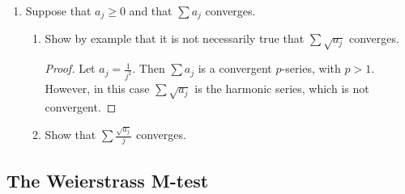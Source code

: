 \documentclass{article}
\begin{document}
\begin{enumerate}
\begin{proof}
                  $\sum_{j=J}^\infty \lvert a_j\rvert < \varepsilon$. Without loss of generality,
                  we can assume that $\varepsilon<1$. Then for all $j>J$, $a_j<1$. This
                  tells us that for all $j>J$, $a_j^2<a_j$ and thus
                  $\sum_{j=J}^\infty a_j^2 < \sum_{j=J}^\infty \lvert a_j\rvert < \varepsilon$.
                  Therefore, $\sum a_j^2$ converges.
            \end{proof}
      \item Suppose that $a_j\geq 0$ and that $\sum a_j$ converges.
            \begin{enumerate}
                  \item Show by example that it is not necessarily true that
                        $\sum\sqrt{a_j}$ converges.
                        \begin{proof}
                              Let $a_j=\frac{1}{j^2}$. Then $\sum a_j$ is a convergent
                              $p$-series, with $p>1$. However, in this case
                              $\sum\sqrt{a_j}$ is the harmonic series, which is not
                              convergent.
                        \end{proof}
                  \item Show that $\sum\frac{\sqrt{a_j}}{j}$ converges.
            \end{enumerate}
\end{enumerate}

\subsection{The Weierstrass M-test}
\end{document}
